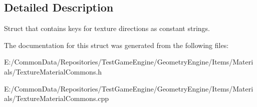 \subsection{Detailed Description}
Struct that contains keys for texture directions as constant strings. 

The documentation for this struct was generated from the following files\+:\begin{DoxyCompactItemize}
\item 
E\+:/\+Common\+Data/\+Repositories/\+Test\+Game\+Engine/\+Geometry\+Engine/\+Items/\+Materials/Texture\+Material\+Commons.\+h\item 
E\+:/\+Common\+Data/\+Repositories/\+Test\+Game\+Engine/\+Geometry\+Engine/\+Items/\+Materials/Texture\+Material\+Commons.\+cpp\end{DoxyCompactItemize}
